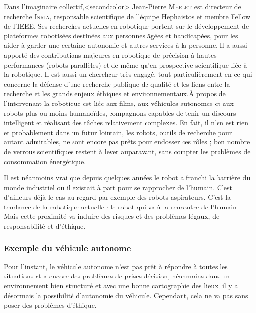 Dans l'imaginaire collectif,\caution[t]<secondcolor>{%
\href{http://www-sop.inria.fr/members/Jean-Pierre.Merlet/merlet.html}{Jean-Pierre \textsc{Merlet}} est directeur de recherche \textsc{Inria}, responsable scientifique de l'équipe \href{https://team.inria.fr/hephaistos/}{Hephaistos} et membre Fellow de l'IEEE. Ses recherches actuelles en robotique portent sur le développement de plateformes robotisées destinées aux personnes âgées et handicapées, pour les aider à garder une certaine autonomie et autres services à la personne. Il a aussi apporté des contributions majeures en robotique de précision à hautes performances (robots parallèles) et de même qu'en prospective scientifique liée à la robotique. Il est aussi un chercheur très engagé, tout particulièrement en ce qui concerne la défense d'une recherche publique de qualité et les liens entre la recherche et les grands enjeux éthiques et environnementaux.}{À propos de l'intervenant}
 la robotique est liée aux films, aux véhicules autonomes et aux robots plus ou moins humanoïdes, compagnons capables de tenir un discours intelligent et réalisant des tâches relativement complexes. En fait, il n'en est rien et probablement dans un futur lointain, les robots, outils de recherche pour autant admirables, ne sont encore pas prêts pour endosser ces rôles ; bon nombre de verrous scientifiques restent à lever auparavant, sans compter les problèmes de consommation énergétique.

Il est néanmoins vrai que depuis quelques années le robot a franchi la barrière du monde industriel ou il existait à part pour se rapprocher de l'humain. C'est d'ailleurs déjà le cas au regard par exemple des robots aspirateurs. C'est la tendance de la robotique actuelle : le robot qui va à la rencontre de l'humain. Mais cette proximité va induire des risques et des problèmes légaux, de responsabilité et d'éthique.

\subsubsection[Exemple du véhicule autonome]{Exemple du véhicule autonome}
\label{subsub:III.3.1.1}

Pour l'instant, le véhicule autonome n'est pas prêt à répondre à toutes les situations et a encore des problèmes de prises décision, néanmoins dans un environnement bien structuré et avec une bonne cartographie des lieux, il y a désormais la possibilité d'autonomie du véhicule. Cependant, cela ne va pas sans poser des problèmes d'éthique.

